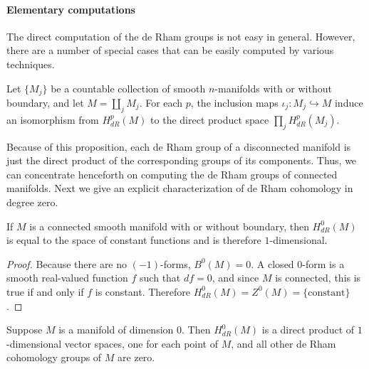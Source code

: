 \paragraph{Elementary computations}
The direct computation of the de Rham groups is not easy in general. However, there are a number of special cases that can be easily computed by various techniques. 
\begin{proposition}
Let $\{M_j\}$ be a countable collection of smooth $n$-manifolds with or without boundary, and let $M=\amalg_jM_j$. For each $p$, the inclusion maps $\iota_j:M_j\hookrightarrow M$ induce an isomorphism from $H^p_{dR}(M)$ to the direct product space $\prod_jH^p_{dR}(M_j)$.
\end{proposition}
Because of this proposition, each de Rham group of a disconnected manifold is just the direct product of the corresponding groups of its components. Thus, we can concentrate henceforth on computing the de Rham groups of connected manifolds. Next we give an explicit characterization of de Rham cohomology in degree zero.
\begin{proposition}\label{cohomology degree 0}
If $M$ is a connected smooth manifold with or without boundary, then $H^0_{dR}(M)$ is equal to the space of constant functions and is therefore $1$-dimensional.
\end{proposition}
\begin{proof}
Because there are no $(-1)$-forms, $B^0(M)=0$. A closed $0$-form is a smooth real-valued function $f$ such that $df=0$, and since $M$ is connected, this is true if
and only if $f$ is constant. Therefore $H^0_{dR}(M)=Z^0(M)=\{\text{constant}\}$.
\end{proof}
\begin{corollary}
Suppose $M$ is a manifold of dimension $0$. Then $H^0_{dR}(M)$ is a direct product of $1$-dimensional vector spaces, one for each point of $M$, and all other de Rham cohomology groups of $M$ are zero.
\end{corollary}
